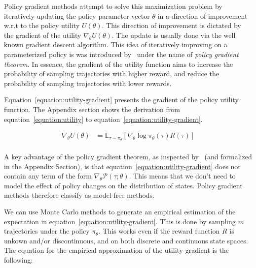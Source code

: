 \documentclass{../main.tex}{}
\begin{document}
Policy gradient methods attempt to solve this maximization problem by iteratively updating the policy parameter vector $\theta$ in a direction of improvement w.r.t to the policy utility $U(\theta)$. This direction of improvement is dictated by the gradient of the utility $\nabla_{\theta}U(\theta)$. The update is usually done via the well known gradient descent algorithm. This idea of iteratively improving on a parameterized policy is was introduced by~\cite{Williams1992} under the name of \textit{policy gradient theorem}. In essence, the gradient of the utility function aims to increase the probability of sampling trajectories with higher reward, and reduce the probability of sampling trajectories with lower rewards.

Equation~\ref{equation:utility-gradient} presents the gradient of the policy utility function. The Appendix section shows the derivation from equation~\ref{equation:utility} to equation~\ref{equation:utility-gradient}.

\begin{equation}\label{equation:utility-gradient}
\begin{aligned}
\nabla_{\theta} U(\theta) & = \mathbb{E}_{\tau \sim \pi_{\theta}} [\nabla_{\theta} \log \pi_{\theta}(\tau) R(\tau)] \\
\end{aligned}
\end{equation}

A key advantage of the policy gradient theorem, as inspected by~\cite{Sutton1999} (and formalized in the Appendix Section), is that equation~\ref{equation:utility-gradient} does not contain any term of the form $\nabla_{\theta}\mathcal{P}(\tau ; \theta)$. This means that we don't need to model the effect of policy changes on the distribution of states. Policy gradient methods therefore classify as model-free methods. 


We can use Monte Carlo methods to generate an empirical estimation of the expectation in equation~\ref{equation:utility-gradient}. This is done by sampling $m$ trajectories under the policy $\pi_{\theta}$. This works even if the reward function $R$ is unkown and/or discontinuous, and on both discrete and continuous state spaces. The equation for the empirical approximation of the utility gradient is the following:
\end{document}
